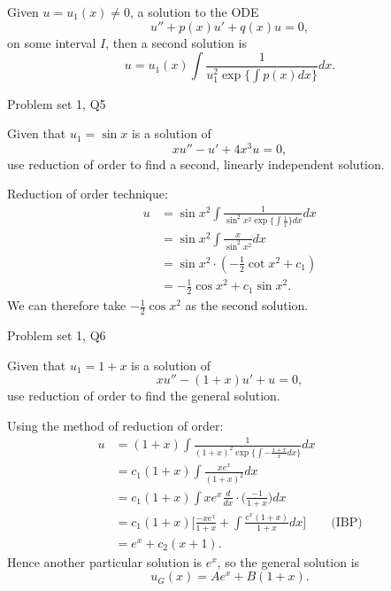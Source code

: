 Given $u = u_1(x) \neq 0$, a solution to the ODE
    $$ u'' + p(x)u' + q(x)u = 0 , $$
on some interval $I$, then a second solution is
    $$ u = u_1(x) \int \frac{1}{u_1^2
        \operatorname{exp}\bigl\{ \int p(x) dx \bigr\}} dx . $$

\begin{problem}{Problem set 1, Q5}{}


    Given that $u_1 = \sin x$ is a solution of
        $$ xu'' - u' + 4x^3 u = 0 , $$
    use reduction of order to find a second, linearly independent solution.

    \tcblower

    Reduction of order technique:
        \begin{align*}
            u &= \sin x^2
                \int \frac{1}{\sin^2 x^2 \operatorname{exp}
                    \bigl\{ \int \frac{1}{x} \bigr\} dx } dx \\
            &= \sin x^2 \int \frac{x}{\sin^2 x^2} dx \\
            &= \sin x^2 \cdot (-\frac{1}{2} \cot x^2 + c_1) \\
            &= -\frac{1}{2} \cos x^2 + c_1 \sin x^2 .
        \end{align*}
    We can therefore take $-\frac{1}{2} \cos x^2$ as the second solution.

\end{problem}

\begin{problem}{Problem set 1, Q6}{}


    Given that $u_1 = 1 + x$ is a solution of
        $$ xu'' - (1 + x)u' + u = 0 , $$
    use reduction of order to find the general solution.

    \tcblower

    Using the method of reduction of order:
        \begin{align*}
            u &= (1 + x) \int \frac{1}{(1 + x)^2 \operatorname{exp}
                \bigl\{ \int -\frac{1+x}{x} dx \bigr\}} dx \\
            &= c_1 (1 + x) \int \frac{x e^x}{(1 + x)^2} dx \\
            &= c_1 (1 + x) \int x e^x \frac{d}{dx}
                \cdot \biggl( \frac{-1}{1 + x} \biggr) dx \\
            &= c_1 (1 + x) \biggl[ 
                \frac{-x e^x}{1 + x}
                + \int \frac{e^x (1 + x)}{1 + x} dx \biggr] 
                \qquad \text{(IBP)} \\
            &= e^x + c_2 (x + 1) .
        \end{align*}
    Hence another particular solution is $e^x$, so the general solution is
        $$ u_G(x) = Ae^x + B(1 + x) . $$

\end{problem}

